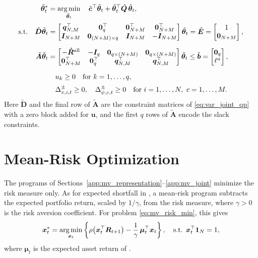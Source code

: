 \begin{equation}
\begin{aligned}
    \tilde{\bm{\theta}}_t^* &= \operatorname*{arg\,min}_{\tilde{\bm{\theta}}_t} \quad
    \tilde{\bm{c}}^\top \tilde{\bm{\theta}}_t + \tilde{\bm{\theta}}_t^\top \tilde{\bm{Q}}\, \tilde{\bm{\theta}}_t, \\[2pt]
    \text{s.t.} \quad
    \tilde{\bm{D}} \tilde{\bm{\theta}}_t &=
    \begin{bmatrix} \bm{q}_{N,M}^\top & \bm{0}_q^\top & \bm{0}_{N+M}^\top & \bm{0}_{N+M}^\top \\
    \bm{I}_{N+M} & \bm{0}_{(N+M) \times q} & \bm{I}_{N+M} & -\bm{I}_{N+M} \end{bmatrix} \tilde{\bm{\theta}}_t
    = \tilde{\bm{E}} = \begin{bmatrix} 1 \\ \bm{0}_{N+M} \end{bmatrix}, \\[6pt]
    \tilde{\bm{A}} \tilde{\bm{\theta}}_t &=
    \begin{bmatrix} -\mathring{\bm{R}}^{\text{all}} & -\bm{I}_q & \bm{0}_{q \times (N+M)} & \bm{0}_{q \times (N+M)} \\
    \bm{0}_{N+M}^\top & \bm{0}_q^\top & \bm{q}_{N,M}^\top & \bm{q}_{N,M}^\top \end{bmatrix} \tilde{\bm{\theta}}_t
    \le \tilde{\bm{b}} = \begin{bmatrix} \bm{0}_q \\ \ell^a \end{bmatrix}, \\[6pt]
    & \quad u_k \ge 0 \quad \text{for } k = 1, \dots, q, \\[2pt]
    & \quad \Delta_{x,i,t}^\pm \ge 0,\quad \Delta_{\psi,c,t}^\pm \ge 0
    \quad \text{for } i = 1, \dots, N,\ c = 1, \dots, M.
\end{aligned}
\end{equation}
Here $\tilde{\bm{D}}$ and the final row of $\tilde{\bm{A}}$ are the constraint matrices of \eqref{eq:var_joint_qp} with
a zero block added for $\bm{u}$, and the first $q$ rows of $\tilde{\bm{A}}$ encode the slack constraints.

\section{Mean-Risk Optimization} \label{app:mv_mean_risk}

The programs of Sections~\ref{app:mv_representation}--\ref{app:mv_joint} minimize the risk measure only. As for
expected shortfall in , a mean-risk program subtracts the expected portfolio return, scaled by
$1/\gamma$, from the risk measure, where $\gamma > 0$ is the risk aversion coefficient. For problem
\eqref{eq:mv_risk_min}, this gives
\begin{equation}
    \bm{x}_t^* = \operatorname*{arg\,min}_{\bm{x}_t} \left\{ \rho\bigl( \bm{x}_t^\top \bm{R}_{t+1} \bigr)
    - \frac{1}{\gamma}\, \bm{\mu}_t^\top \bm{x}_t \right\}, \quad \text{s.t. } \bm{x}_t^\top \bm{1}_N = 1,
\end{equation}
where $\bm{\mu}_t$ is the expected asset return of .

